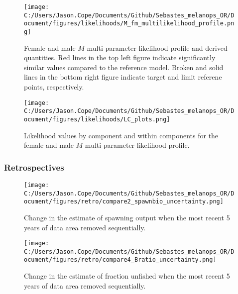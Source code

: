 \documentclass[11pt,
  english,
  letterpaper,
]{article}
\begin{document}
\pagebreak

\begin{figure}
\centering
\texttt{[image: C:/Users/Jason.Cope/Documents/Github/Sebastes\_melanops\_OR/Document/figures/likelihoods/M\_fm\_multilikelihood\_profile.png]}
\caption{Female and male \(M\) multi-parameter likelihood profile and derived quantities. Red lines in the top left figure indicate significantly similar values compared to the reference model. Broken and solid lines in the bottom right figure indicate target and limit referene points, respectively.\label{fig:M-multiprofile-combo}}
\end{figure}

\pagebreak

\begin{figure}
\centering
\texttt{[image: C:/Users/Jason.Cope/Documents/Github/Sebastes\_melanops\_OR/Document/figures/likelihoods/LC\_plots.png]}
\caption{Likelihood values by component and within components for the female and male \(M\) multi-parameter likelihood profile.\label{fig:M-multiprofile-like-components}}
\end{figure}

\newpage

\hypertarget{retrospectives}{%
\subsubsection{Retrospectives}\label{retrospectives}}

\begin{figure}
\centering
\texttt{[image: C:/Users/Jason.Cope/Documents/Github/Sebastes\_melanops\_OR/Document/figures/retro/compare2\_spawnbio\_uncertainty.png]}
\caption{Change in the estimate of spawning output when the most recent 5 years of data area removed sequentially.\label{fig:retro-ssb}}
\end{figure}

\newpage

\begin{figure}
\centering
\texttt{[image: C:/Users/Jason.Cope/Documents/Github/Sebastes\_melanops\_OR/Document/figures/retro/compare4\_Bratio\_uncertainty.png]}
\caption{Change in the estimate of fraction unfished when the most recent 5 years of data area removed sequentially.\label{fig:retro-depl}}
\end{figure}

\newpage
\end{document}
